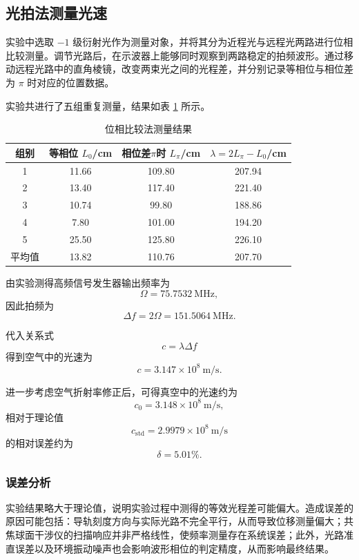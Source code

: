 \documentclass[a4paper]{ctexart}
\begin{document}
\subsection{光拍法测量光速}

实验中选取 $-1$ 级衍射光作为测量对象，并将其分为近程光与远程光两路进行位相比较测量。调节光路后，在示波器上能够同时观察到两路稳定的拍频波形。通过移动远程光路中的直角棱镜，改变两束光之间的光程差，并分别记录等相位与相位差为 $\pi$ 时对应的位置数据。

实验共进行了五组重复测量，结果如表 \ref{tab:phase_measurement} 所示。

\begin{table}[ht]
    \centering
    \caption{位相比较法测量结果}
    \label{tab:phase_measurement}
    \begin{tabular}{cccc}
        \toprule
        组别 & 等相位 $L_0$/cm & 相位差$\pi$时 $L_{\pi}$/cm & $\lambda =2L_{\pi}-L_0$/cm \\
        \midrule
        1 & 11.66 & 109.80 & 207.94 \\
        2 & 13.40 & 117.40 & 221.40 \\
        3 & 10.74 & 99.80 & 188.86 \\
        4 & 7.80 & 101.00 & 194.20 \\
        5 & 25.50 & 125.80 & 226.10 \\
        \midrule
        平均值 & 13.82 & 110.76 & 207.70 \\
        \bottomrule
    \end{tabular}
\end{table}

由实验测得高频信号发生器输出频率为
\[
\Omega =75.7532\ \mathrm{MHz},
\]
因此拍频为
\[
\Delta f =2\Omega =151.5064\ \mathrm{MHz}.
\]

代入关系式
\[
c=\lambda \Delta f
\]
得到空气中的光速为
\[
c =3.147\times10^8\ \mathrm{m/s}.
\]

进一步考虑空气折射率修正后，可得真空中的光速约为
\[
c_0 =3.148\times10^8\ \mathrm{m/s},
\]
相对于理论值
\[
c_{\mathrm{std}} =2.9979\times10^8\ \mathrm{m/s}
\]
的相对误差约为
\[
\delta =5.01\%.
\]

\subsubsection*{误差分析}

实验结果略大于理论值，说明实验过程中测得的等效光程差可能偏大。造成误差的原因可能包括：导轨刻度方向与实际光路不完全平行，从而导致位移测量偏大；共焦球面干涉仪的扫描响应并非严格线性，使频率测量存在系统误差；此外，光路准直误差以及环境振动噪声也会影响波形相位的判定精度，从而影响最终结果。
\end{document}
